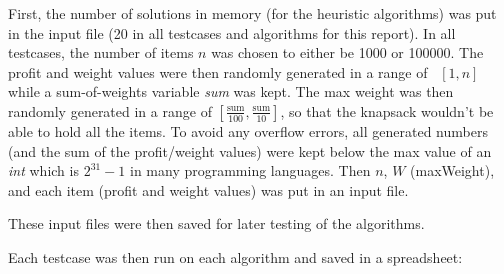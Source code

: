 \documentclass[titlepage]{article}
\begin{document}
First, the number of solutions in memory (for the heuristic algorithms) was put in the input file (20 in all testcases and algorithms for this report). In all testcases, the number of items $n$ was chosen to either be 1000 or 100000. The profit and weight values were then randomly generated in a range of \, $ [1, n] $ while a sum-of-weights variable \emph{sum} was kept. The max weight was then randomly generated in a range of $[\frac{\text{sum}}{100} , \frac{\text{sum}}{10}]$, so that the knapsack wouldn't be able to hold all the items. To avoid any overflow errors, all generated numbers (and the sum of the profit/weight values) were kept below the max value of an \emph{int} which is $2^{31}-1$ in many programming languages.  Then $n$, $W$ (maxWeight), and each item (profit and weight values) was put in an input file. 

These input files were then saved for later testing of the algorithms. 

Each testcase was then run on each algorithm and saved in a spreadsheet:



 
\end{document}

